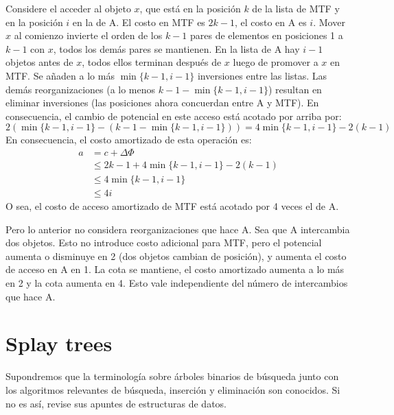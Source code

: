   Considere el acceder al objeto \(x\),
  que está en la posición \(k\) de la lista de MTF
  y en la posición \(i\) en la de A.
  El costo en MTF es \(2 k - 1\),
  el costo en A es \(i\).
  Mover \(x\) al comienzo invierte el orden de los \(k - 1\) pares
  de elementos en posiciones \num{1} a \(k - 1\) con \(x\),
  todos los demás pares se mantienen.
  En la lista de A hay \(i - 1\) objetos antes de \(x\),
  todos ellos terminan después de \(x\) luego de promover a \(x\) en MTF.
  Se añaden a lo más \(\min \{ k - 1, i - 1 \}\) inversiones entre las listas.
  Las demás reorganizaciones
  (a lo menos \(k - 1 - \min \{ k - 1, i - 1 \}\))
  resultan en eliminar inversiones
  (las posiciones ahora concuerdan entre A y MTF).
  En consecuencia,
  el cambio de potencial en este acceso está acotado por arriba por:
  \begin{equation*}
    2 ( \min \{ k - 1, i - 1 \} - (k - 1 - \min \{ k - 1, i - 1 \}) )
      = 4 \min \{ k - 1, i - 1 \} - 2 (k - 1)
  \end{equation*}
  En consecuencia,
  el costo amortizado de esta operación es:
  \begin{align*}
    a
      &=   c + \Delta \Phi \\
      &\le 2 k - 1 + 4 \min \{ k - 1, i - 1 \} - 2 (k - 1) \\
      &\le 4 \min \{ k - 1, i - 1 \} \\
      & \le 4 i
  \end{align*}
  O sea,
  el costo de acceso amortizado de MTF está acotado por \num{4} veces el de A.

  Pero lo anterior no considera reorganizaciones que hace A.
  Sea que A intercambia dos objetos.
  Esto no introduce costo adicional para MTF,
  pero el potencial aumenta o disminuye en \num{2}
  (dos objetos cambian de posición),
  y aumenta el costo de acceso en A en \num{1}.
  La cota se mantiene,
  el costo amortizado aumenta a lo más en 2
  y la cota aumenta en \num{4}.
  Esto vale independiente del número de intercambios que hace A.

\section{Splay trees}
\label{sec:splay-trees}

  Supondremos que la terminología sobre árboles binarios de búsqueda
  junto con los algoritmos relevantes de búsqueda, inserción y eliminación
  son conocidos.
  Si no es así,
  revise sus apuntes de estructuras de datos.

